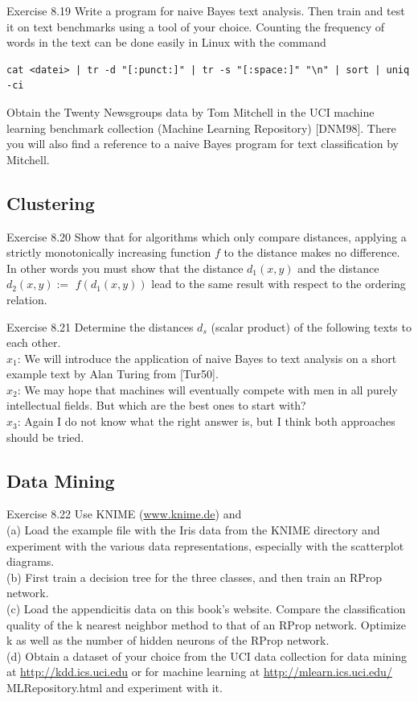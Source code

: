 \documentclass[10pt]{book}
\begin{document}
Exercise 8.19 Write a program for naive Bayes text analysis. Then train and test it on text benchmarks using a tool of your choice. Counting the frequency of words in the text can be done easily in Linux with the command

\begin{verbatim}
cat <datei> | tr -d "[:punct:]" | tr -s "[:space:]" "\n" | sort | uniq -ci
\end{verbatim}

Obtain the Twenty Newsgroups data by Tom Mitchell in the UCI machine learning benchmark collection (Machine Learning Repository) [DNM98]. There you will also find a reference to a naive Bayes program for text classification by Mitchell.

\subsection{Clustering}
Exercise 8.20 Show that for algorithms which only compare distances, applying a strictly monotonically increasing function $f$ to the distance makes no difference. In other words you must show that the distance $d_{1}(x, y)$ and the distance $d_{2}(x, y):=$ $f\left(d_{1}(x, y)\right)$ lead to the same result with respect to the ordering relation.

Exercise 8.21 Determine the distances $d_{s}$ (scalar product) of the following texts to each other.\\
$x_{1}$: We will introduce the application of naive Bayes to text analysis on a short example text by Alan Turing from [Tur50].\\
$x_{2}$: We may hope that machines will eventually compete with men in all purely intellectual fields. But which are the best ones to start with?\\
$x_{3}$: Again I do not know what the right answer is, but I think both approaches should be tried.

\subsection{Data Mining}
Exercise 8.22 Use KNIME (\href{http://www.knime.de}{www.knime.de}) and\\
(a) Load the example file with the Iris data from the KNIME directory and experiment with the various data representations, especially with the scatterplot diagrams.\\
(b) First train a decision tree for the three classes, and then train an RProp network.\\
(c) Load the appendicitis data on this book's website. Compare the classification quality of the k nearest neighbor method to that of an RProp network. Optimize k as well as the number of hidden neurons of the RProp network.\\
(d) Obtain a dataset of your choice from the UCI data collection for data mining at \href{http://kdd.ics.uci.edu}{http://kdd.ics.uci.edu} or for machine learning at \href{http://mlearn.ics.uci.edu/}{http://mlearn.ics.uci.edu/} MLRepository.html and experiment with it.
\end{document}
